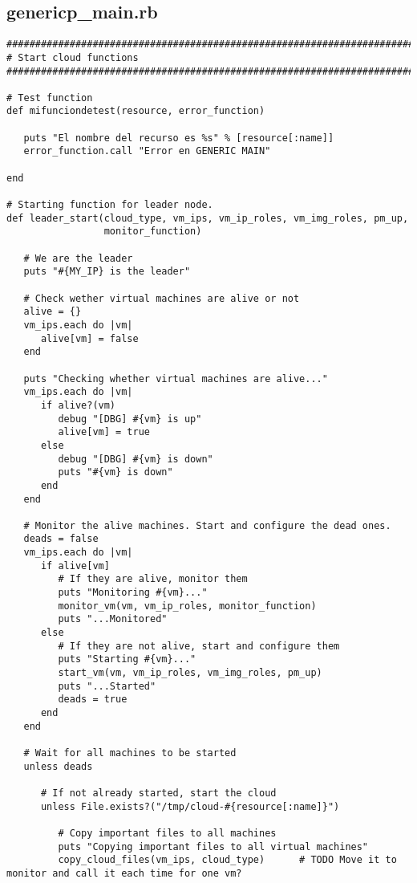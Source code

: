 \subsection{genericp\_main.rb}


\begin{lstlisting}
################################################################################
# Start cloud functions
################################################################################

# Test function
def mifunciondetest(resource, error_function)

   puts "El nombre del recurso es %s" % [resource[:name]]
   error_function.call "Error en GENERIC MAIN"

end

# Starting function for leader node.
def leader_start(cloud_type, vm_ips, vm_ip_roles, vm_img_roles, pm_up,
                 monitor_function)
   
   # We are the leader
   puts "#{MY_IP} is the leader"
   
   # Check wether virtual machines are alive or not
   alive = {}
   vm_ips.each do |vm|
      alive[vm] = false
   end
   
   puts "Checking whether virtual machines are alive..."
   vm_ips.each do |vm|
      if alive?(vm)
         debug "[DBG] #{vm} is up"
         alive[vm] = true
      else
         debug "[DBG] #{vm} is down"
         puts "#{vm} is down"
      end
   end
   
   # Monitor the alive machines. Start and configure the dead ones.
   deads = false
   vm_ips.each do |vm|
      if alive[vm]
         # If they are alive, monitor them
         puts "Monitoring #{vm}..."
         monitor_vm(vm, vm_ip_roles, monitor_function)
         puts "...Monitored"
      else
         # If they are not alive, start and configure them
         puts "Starting #{vm}..."
         start_vm(vm, vm_ip_roles, vm_img_roles, pm_up)
         puts "...Started"
         deads = true
      end
   end
   
   # Wait for all machines to be started
   unless deads
   
      # If not already started, start the cloud
      unless File.exists?("/tmp/cloud-#{resource[:name]}")
         
         # Copy important files to all machines
         puts "Copying important files to all virtual machines"
         copy_cloud_files(vm_ips, cloud_type)      # TODO Move it to monitor and call it each time for one vm?
      

\end{lstlisting}
